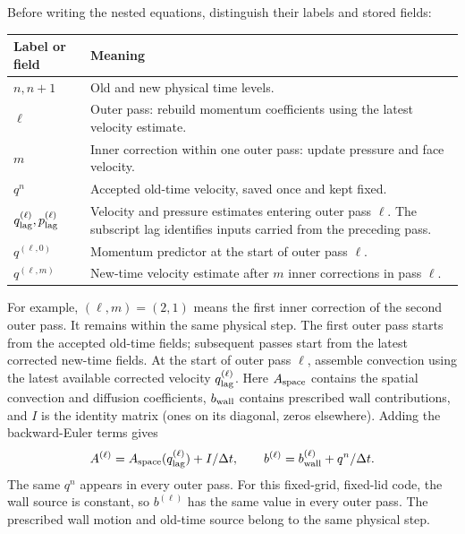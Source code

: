 Before writing the nested equations, distinguish their labels and stored fields:
\begin{center}\begin{tabular}{lp{.72\linewidth}}\toprule
Label or field & Meaning\\\midrule
$n,n+1$ & Old and new physical time levels.\\
$\ell$ & Outer pass: rebuild momentum coefficients using the latest velocity estimate.\\
$m$ & Inner correction within one outer pass: update pressure and face velocity.\\
$q^n$ & Accepted old-time velocity, saved once and kept fixed.\\
$q_{\rm lag}^{(\ell)},p_{\rm lag}^{(\ell)}$ & Velocity and pressure estimates entering outer pass $\ell$. The subscript lag identifies inputs carried from the preceding pass.\\
$q^{(\ell,0)}$ & Momentum predictor at the start of outer pass $\ell$.\\
$q^{(\ell,m)}$ & New-time velocity estimate after $m$ inner corrections in pass $\ell$.\\\bottomrule
\end{tabular}\end{center}
For example, $(\ell,m)=(2,1)$ means the first inner correction of the second
outer pass. It remains within the same physical step. The first outer pass
starts from the accepted old-time fields; subsequent passes start from the
latest corrected new-time fields.
\newpage
{}
At the start of outer pass $\ell$, assemble convection using the latest available corrected velocity $q_{\rm lag}^{(\ell)}$. Here $A_{\rm space}$ contains the spatial convection and diffusion coefficients,
$b_{\rm wall}$ contains prescribed wall contributions, and $I$ is the identity
matrix (ones on its diagonal, zeros elsewhere). Adding the backward-Euler terms gives
\[
A^{(\ell)}=A_{\rm space}(q_{\rm lag}^{(\ell)})+I/\Delta t,
\qquad b^{(\ell)}=b_{\rm wall}^{(\ell)}+q^n/\Delta t.
\]
The same $q^n$ appears in every outer pass. For this fixed-grid, fixed-lid code, the wall source is constant, so $b^{(\ell)}$ has the same value in every outer pass. The prescribed wall motion and old-time source belong to the same physical step.

